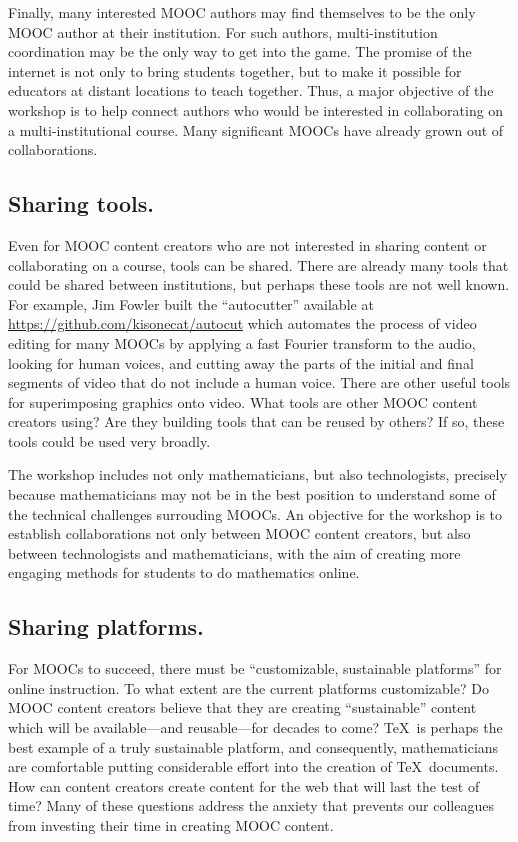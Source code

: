 \documentclass[12pt]{amsart}
\begin{document}
Finally, many interested MOOC authors may find themselves to be the
only MOOC author at their institution.  For such authors,
multi-institution coordination may be the only way to get into the
game.  The promise of the internet is not only to bring students
together, but to make it possible for educators at distant locations
to teach together.  Thus, a major objective of the workshop is to help
connect authors who would be interested in collaborating on a
multi-institutional course.  Many significant MOOCs have already grown
out of collaborations.

\subsection{Sharing tools.} Even for MOOC content creators who are not
interested in sharing content or collaborating on a course, tools can
be shared.  There are already many tools that could be shared between
institutions, but perhaps these tools are not well known.  For
example, Jim Fowler built the ``autocutter'' available at
\url{https://github.com/kisonecat/autocut} which automates the process
of video editing for many MOOCs by applying a fast Fourier transform
to the audio, looking for human voices, and cutting away the parts of
the initial and final segments of video that do not include a human
voice.  There are other useful tools for superimposing graphics onto
video.  What tools are other MOOC content creators using?  Are they
building tools that can be reused by others?  If so, these tools could
be used very broadly.

The workshop includes not only mathematicians, but also technologists,
precisely because mathematicians may not be in the best position to
understand some of the technical challenges surrouding MOOCs.  An
objective for the workshop is to establish collaborations not only
between MOOC content creators, but also between technologists and
mathematicians, with the aim of creating more engaging methods for
students to do mathematics online.

\subsection{Sharing platforms.}  For MOOCs to succeed, there must be
``customizable, sustainable platforms'' \parencite{bowen2013higher}
for online instruction.  To what extent are the current platforms
customizable?  Do MOOC content creators believe that they are creating
``sustainable'' content which will be available---and reusable---for
decades to come?  \TeX\ is perhaps the best example of a truly
sustainable platform, and consequently, mathematicians are comfortable
putting considerable effort into the creation of \TeX\ documents.  How
can content creators create content for the web that will last the
test of time?  Many of these questions address the anxiety that
prevents our colleagues from investing their time in creating MOOC
content.
\end{document}
